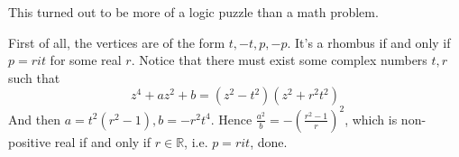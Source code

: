 This turned out to be more of a logic puzzle than a math problem.

First of all, the vertices are of the form $t, -t, p, -p$. It's a rhombus if and only if $p=rit$ for some real $r$.
Notice that there must exist some complex numbers $t, r$ such that
$$z^4+az^2+b=(z^2-t^2)(z^2+r^2t^2)$$
And then $a=t^2(r^2-1), b=-r^2t^4$. Hence $\frac{a^2}{b}=-\left(\frac{r^2-1}{r}\right)^2$, which is non-positive real
if and only if $r\in\mathbb{R}$, i.e. $p=rit$, done.
